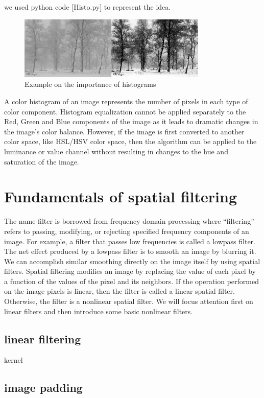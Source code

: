 \documentclass[a4paper]{article}
\begin{document}
we used python code [Histo.py] to represent the idea.
\begin{figure}[htbp]
\centering
\includegraphics[angle=0,width=9cm]{./img/res.png}
\caption{\label{result of histogram equalization}Example on the importance of histograms}
\end{figure}

A color histogram of an image represents the number of pixels in each type of color component.
Histogram equalization cannot be applied separately to the Red, Green and Blue components of the image as
it leads to dramatic changes in the image’s color balance.
However, if the image is first converted to another color space, like HSL/HSV color space,
then the algorithm can be applied to the luminance or value channel without
resulting in changes to the hue and saturation of the image.
\section{Fundamentals of spatial filtering}
\label{sec:org27a6e22}
The name filter is borrowed from frequency domain processing where “filtering” refers to passing, modifying,
or rejecting specified frequency components of an image. For example, a filter that passes low frequencies is called a lowpass filter.
The net effect produced by a lowpass filter is to smooth an image by blurring it. We can accomplish similar smoothing directly on the
image itself by using spatial filters.
Spatial filtering modifies an image by replacing the value of each pixel by a function of the values of the pixel and its neighbors. If the
operation performed on the image pixels is linear, then the filter is called a linear spatial filter. Otherwise, the filter is a nonlinear spatial
filter. We will focus attention first on linear filters and then introduce some basic nonlinear filters. 
\subsection{linear filtering}
\label{sec:org98fddc8}
kernel
\subsection{image padding}
\label{sec:org7f7d75c}
\end{document}
